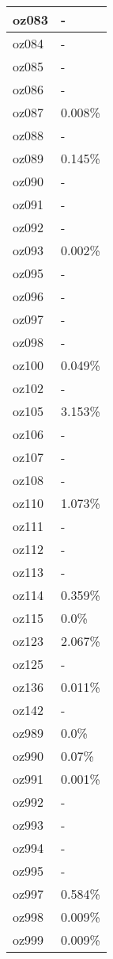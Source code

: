 \documentclass{article}%
\begin{document}
\begin{longtabu}{X[l] X[r]}
oz083&{-}\\%
\hline%
oz084&{-}\\%
\hline%
oz085&{-}\\%
\hline%
oz086&{-}\\%
\hline%
oz087&0.008\%\\%
\hline%
oz088&{-}\\%
\hline%
oz089&0.145\%\\%
\hline%
oz090&{-}\\%
\hline%
oz091&{-}\\%
\hline%
oz092&{-}\\%
\hline%
oz093&0.002\%\\%
\hline%
oz095&{-}\\%
\hline%
oz096&{-}\\%
\hline%
oz097&{-}\\%
\hline%
oz098&{-}\\%
\hline%
oz100&0.049\%\\%
\hline%
oz102&{-}\\%
\hline%
oz105&3.153\%\\%
\hline%
oz106&{-}\\%
\hline%
oz107&{-}\\%
\hline%
oz108&{-}\\%
\hline%
oz110&1.073\%\\%
\hline%
oz111&{-}\\%
\hline%
oz112&{-}\\%
\hline%
oz113&{-}\\%
\hline%
oz114&0.359\%\\%
\hline%
oz115&0.0\%\\%
\hline%
oz123&2.067\%\\%
\hline%
oz125&{-}\\%
\hline%
oz136&0.011\%\\%
\hline%
oz142&{-}\\%
\hline%
oz989&0.0\%\\%
\hline%
oz990&0.07\%\\%
\hline%
oz991&0.001\%\\%
\hline%
oz992&{-}\\%
\hline%
oz993&{-}\\%
\hline%
oz994&{-}\\%
\hline%
oz995&{-}\\%
\hline%
oz997&0.584\%\\%
\hline%
oz998&0.009\%\\%
\hline%
oz999&0.009\%\\%
\hline%
\end{longtabu}%
\end{document}
